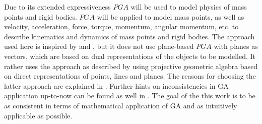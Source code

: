 Due to its extended expressiveness $PGA$ will be used to model physics of mass points and
rigid bodies. $PGA$ will be applied to model mass points, as well as velocity,
acceleration, force, torque, momentum, angular momentum, etc. to describe kinematics and
dynamics of mass points and rigid bodies. The approach used here is inspired by
\cite{Plane-based_PGA_Dorst-DeKennik:2022} and
\cite{Dynamics_in_PGA_plane-based_Dorst-DeKennik:2023}, but it does not use plane-based
$PGA$ with planes as vectors, which are based on dual representations of the objects to be
modelled. It rather uses the approach as described by \cite{Lengyel_pga-illuminated:2024}
using projective geometric algebra based on direct representations of points, lines and
planes. The reasons for choosing the latter approach are explained in
\cite{Lengyel_poor-foundations_GA:2024}. Further hints on inconsistencies in GA
application up-to-now can be found as well in \cite{Kritchevsky_case_against_GA:2024}. The
goal of the this work is to be as consistent in terms of mathematical application of GA
and as intuitively applicable as possible. \\









\newpage